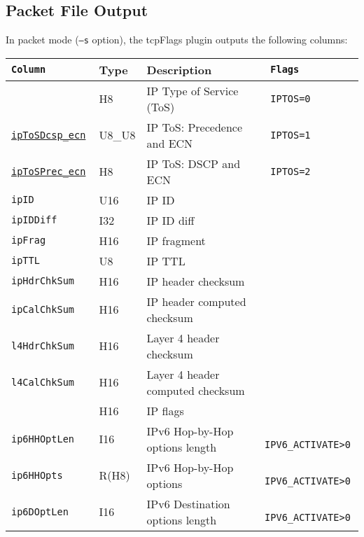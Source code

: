 \documentclass[documentation]{subfiles}
\begin{document}
\subsection{Packet File Output}
In packet mode ({\tt --s} option), the tcpFlags plugin outputs the following columns:
\begin{longtable}{>{\tt}lll>{\tt\small}l}
    \toprule
    {\bf Column}         & {\bf Type} & {\bf Description}                   & {\bf Flags}\\
    \midrule\endhead%
    \nameref{ipToS}                  & H8      & IP Type of Service (ToS)                     & IPTOS=0\\
    \hyperref[ipToS]{ipToSDcsp\_ecn} & U8\_U8  & IP ToS: Precedence and ECN                   & IPTOS=1\\
    \hyperref[ipToS]{ipToSPrec\_ecn} & H8      & IP ToS: DSCP and ECN                         & IPTOS=2\\
    ipID                             & U16     & IP ID                                        & \\
    ipIDDiff                         & I32     & IP ID diff                                   & \\
    ipFrag                           & H16     & IP fragment                                  & \\
    ipTTL                            & U8      & IP TTL                                       & \\
    ipHdrChkSum                      & H16     & IP header checksum                           & \\
    ipCalChkSum                      & H16     & IP header computed checksum                  & \\
    l4HdrChkSum                      & H16     & Layer 4 header checksum                      & \\
    l4CalChkSum                      & H16     & Layer 4 header computed checksum             & \\
    \nameref{ipFlags}                & H16     & IP flags                                     & \\
    ip6HHOptLen                      & I16     & IPv6 Hop-by-Hop options length               & IPV6\_ACTIVATE>0\\
    ip6HHOpts                        & R(H8)   & IPv6 Hop-by-Hop options                      & IPV6\_ACTIVATE>0\\
    ip6DOptLen                       & I16     & IPv6 Destination options length              & IPV6\_ACTIVATE>0\\

\end{longtable}
\end{document}

